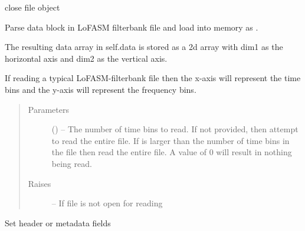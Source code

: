 \documentclass[letterpaper,10pt,english]{sphinxmanual}
\begin{document}
\begin{fulllineitems}
\begin{fulllineitems}
\begin{quote}
\begin{description}
\end{description}\end{quote}

\end{fulllineitems}


\begin{fulllineitems}
\label{index:lofasm.bbx.bbx.LofasmFile.close}
close file object

\end{fulllineitems}


\begin{fulllineitems}
\label{index:lofasm.bbx.bbx.LofasmFile.read_data}
Parse data block in LoFASM filterbank file and load into memory as .

The resulting data array in self.data is stored as a 2d array with dim1 as the horizontal axis and
dim2 as the vertical axis.

If reading a typical LoFASM-filterbank file then the x-axis will represent the time bins and the y-axis will
represent the frequency bins.
\begin{quote}\begin{description}
\item[{Parameters}] \leavevmode
{} () -- The number of time bins to read. If not provided, then attempt to read the entire file.
If  is larger than the number of time bins in the file then read the entire file.
A value of 0 will result in nothing being read.

\item[{Raises}] \leavevmode
{} -- If file is not open for reading

\end{description}\end{quote}

\end{fulllineitems}


\begin{fulllineitems}
\label{index:lofasm.bbx.bbx.LofasmFile.set}
Set header or metadata fields


\end{fulllineitems}
\end{fulllineitems}
\end{document}
